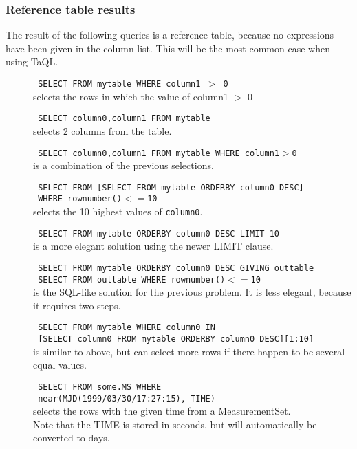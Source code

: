 \subsubsection{Reference table results}
The result of the following queries is a reference table, because no
expressions have been given in the column-list. This will be the most
common case when using TaQL.
\begin{description}
  \item[] \texttt{ SELECT FROM mytable WHERE column1 $>$ 0 }
    \\selects the rows in which the value of column1 $>$ 0

  \item[] \texttt{ SELECT column0,column1 FROM mytable }
    \\selects 2 columns from the table.

  \item[] \texttt{ SELECT column0,column1 FROM mytable WHERE column1$>$0 }
    \\is a combination of the previous selections.

  \item[] \texttt{ SELECT FROM [SELECT FROM mytable ORDERBY column0 DESC] }
    \\\texttt{ WHERE rownumber()$<=$10 }
    \\selects the 10 highest values of \texttt{column0}.

  \item[] \texttt{ SELECT FROM mytable ORDERBY column0 DESC LIMIT 10 }
    \\is a more elegant solution using the newer LIMIT clause.

  \item[] \texttt{ SELECT FROM mytable ORDERBY column0 DESC GIVING outtable }
    \\\texttt{ SELECT FROM outtable WHERE rownumber()$<=$10 }
    \\is the SQL-like solution for the previous problem.
    It is less elegant, because it requires two steps.

  \item[] \texttt{ SELECT FROM mytable WHERE column0 IN }
    \\\texttt{ [SELECT column0 FROM mytable ORDERBY column0 DESC][1:10] }
    \\is similar to above, but can select more rows if there happen
    to be several equal values.

  \item[] \texttt{ SELECT FROM some.MS WHERE }
    \\\texttt{ near(MJD(1999/03/30/17:27:15), TIME) }
    \\selects the rows with the given time from a MeasurementSet.
    \\Note that the TIME is stored in seconds, but will automatically
	be converted to days.


\end{description}
